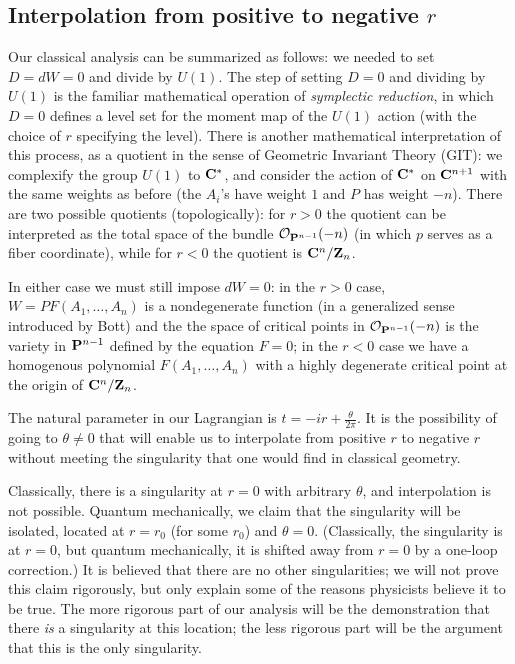 \subsection{Interpolation from positive to negative $r$}

Our classical analysis can be summarized as follows: we needed to set
$D=dW=0$ and divide by $U(1)$.
The step of setting $D=0$ and dividing by $U(1)$ is the familiar
mathematical operation of
{\it symplectic reduction}, in which $D=0$ defines a level set for the
moment map of the $U(1)$ action
(with the choice of $r$ specifying the level).  There is another
mathematical interpretation
of this process, as a quotient in the sense of Geometric Invariant Theory
(GIT):  we complexify
the group $U(1)$ to ${\bf C}^*$, and consider the action of ${\bf C}^*$ on
${\bf C}^{n+1}$ with
the same weights as before (the $A_i$'s have weight $1$ and $P$ has weight
$-n$).  There are
two possible quotients (topologically): for $r>0$ the quotient can be
interpreted as the total
space of the bundle ${\cal O}_{{\bf P}^{n-1}}(-n)$ (in which $p$ serves as
a fiber coordinate),
while for $r<0$ the quotient is ${\bf C}^n/{\bf Z}_n$.

In either case we must still impose $dW=0$: in the $r>0$ case,
$W=PF(A_1,\dots,A_n)$ is a
nondegenerate function (in a generalized sense introduced by Bott)
and the the space of
critical points in
${\cal O}_{{\bf P}^{n-1}}(-n)$ is the variety in ${\bf P}^{n-1}$
defined by the equation $F=0$; in the
$r<0$ case we have a homogenous polynomial $F(A_1,\dots,A_n)$ with a highly
degenerate critical point
at the origin of  ${\bf C}^n/{\bf Z}_n$.

The natural parameter in our Lagrangian is $t=-ir+\frac\theta{2\pi}$.
It is the possibility of going to $\theta\not= 0$
that will enable us to interpolate from positive $r$ to
negative $r$ without meeting the singularity that one would find
in classical geometry.

\centerline{\quad}
\centerline{\epsfysize=1.35in}
\centerline{\quad}

Classically, there is a singularity at $r=0$ with arbitrary $\theta$, and
interpolation is not
possible.  Quantum mechanically, we claim that the singularity will be
isolated, located at $r=r_0$ (for some $r_0$)
and $\theta=0$.  (Classically, the singularity is at $r=0$, but
quantum mechanically, it is shifted away from $r=0$
by a one-loop correction.)  It is believed that there are
no other singularities; we will not prove this claim
rigorously, but only explain
some of the reasons physicists believe it to be true.  The more
rigorous part of our analysis will be
the demonstration that there {\it is}\/ a singularity at this location; the
less rigorous part will
be the argument that this is the only singularity.

